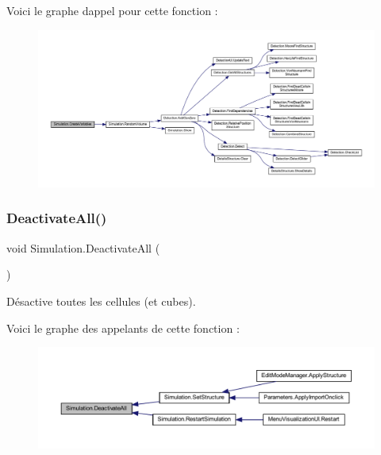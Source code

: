 Voici le graphe d\textquotesingle{}appel pour cette fonction \+:
\nopagebreak
\begin{figure}[H]
\begin{center}
\leavevmode
\includegraphics[width=350pt]{class_simulation_aeb4bcb9efba94261ae3225d7c77d4fe9_cgraph}
\end{center}
\end{figure}
\mbox{\label{class_simulation_abc1bd1d93c293257a921a8a8935095b6}} 
\subsubsection{\texorpdfstring{Deactivate\+All()}{DeactivateAll()}}
{\footnotesize\ttfamily void Simulation.\+Deactivate\+All (\begin{DoxyParamCaption}{ }\end{DoxyParamCaption})\hspace{0.3cm}{\ttfamily [inline]}}



Désactive toutes les cellules (et cubes). 

Voici le graphe des appelants de cette fonction \+:
\nopagebreak
\begin{figure}[H]
\begin{center}
\leavevmode
\includegraphics[width=350pt]{class_simulation_abc1bd1d93c293257a921a8a8935095b6_icgraph}
\end{center}
\end{figure}
\mbox{\label{class_simulation_ade3470a637773f3e751ce4b0923c3909}} 
